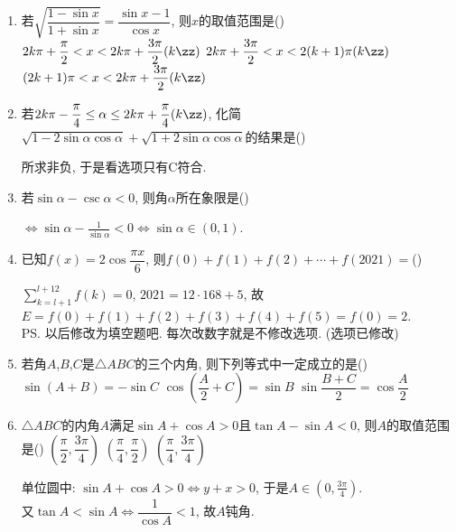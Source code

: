 \begin{enumerate}
\item 若$\sqrt{\dfrac{1-\sin{x}}{1+\sin{x}}}=\dfrac{\sin{x}-1}{\cos{x}}$, 则$x$的取值范围是\dotfill()
{$2k\pi+\dfrac{\pi}{2}<x<2k\pi+\dfrac{3\pi}{2}(k\zz)$}
{$2k\pi+\dfrac{3\pi}{2}<x<2(k+1)\pi(k\zz)$}
{$(2k+1)\pi<x<2k\pi+\dfrac{3\pi}{2}(k\zz)$}

\item 若$2k\pi-\dfrac{\pi}{4}\leq \alpha\leq 2k\pi+\dfrac{\pi}{4}(k\zz)$, 
化简$\sqrt{1-2\sin\alpha\cos\alpha}+\sqrt{1+2\sin\alpha\cos\alpha}$的结果是\dotfill()
\xx{$2\sin\alpha$}{$-2\sin\alpha$}{$2\cos\alpha$}{$-2\cos\alpha$}
\begin{jieda}
所求非负, 于是看选项只有C符合. 
\end{jieda}

\item 若$\sin\alpha-\csc\alpha<0$, 则角$\alpha$所在象限是\dotfill()
\begin{jieda}
$\iff\sin\alpha-\frac{1}{\sin\alpha}<0\iff\sin\alpha\in(0,1)$. 
\end{jieda}


\item 已知$f(x)=2\cos\dfrac{\pi x}{6}$, 则$f(0)+f(1)+f(2)+\cdots+f(2021)=$\dotfill()
\begin{jieda}
$\sum\limits_{k=l+1}^{l+12}f(k)=0$, $2021=12\cdot168+5$, 
故$E=f(0)+f(1)+f(2)+f(3)+f(4)+f(5)=f(0)=2$. \\
\ps 以后修改为填空题吧. 每次改数字就是不修改选项. (选项已修改)
\end{jieda}

\item 若角$A$,$B$,$C$是$\triangle{ABC}$的三个内角, 则下列等式中一定成立的是\dotfill()
{$\sin(A+B)=-\sin{C}$}
{$\cos\left(\dfrac{A}{2}+C\right)=\sin{B}$}
{$\sin\dfrac{B+C}{2}=\cos\dfrac{A}{2}$}

\item $\triangle{ABC}$的内角$A$满足$\sin{A}+\cos{A}>0$且$\tan{A}-\sin{A}<0$, 则$A$的取值范围是\dotfill()
{$\left(\dfrac{\pi}{2},\dfrac{3\pi}{4}\right)$}
{$\left(\dfrac{\pi}{4},\dfrac{\pi}{2}\right)$}
{$\left(\dfrac{\pi}{4},\dfrac{3\pi}{4}\right)$}
\begin{jieda}
单位圆中: $\sin{A}+\cos{A}>0\iff y+x>0$, 于是$A\in(0,\frac{3\pi}{4})$. \\
又$\tan{A}<\sin{A}\iff\dfrac{1}{\cos{A}}<1$, 故$A$钝角. 
\end{jieda}


\end{enumerate}
